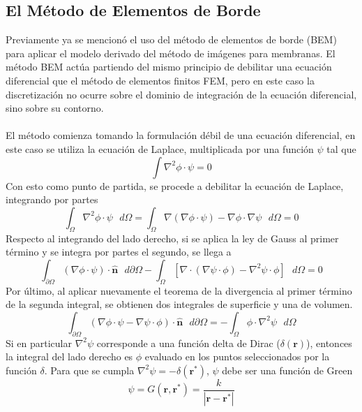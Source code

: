 \documentclass[12pt, notitlepage]{article}
\numberwithin{equation}{section}
\begin{document}
\subsection{El Método de Elementos de Borde}
Previamente ya se mencionó el uso del método de elementos de borde (BEM) para aplicar el modelo derivado del método de imágenes para membranas. El método BEM actúa partiendo del mismo principio de debilitar una ecuación diferencial que el método de elementos finitos FEM, pero en este caso la discretización no ocurre sobre el dominio de integración de la ecuación diferencial, sino sobre su contorno.\\\\
El método comienza tomando la formulación débil de una ecuación diferencial, en este caso se utiliza la ecuación de Laplace, multiplicada por una función $\psi$ tal que
\begin{equation}
\int\nabla^2 \phi\cdot\psi = 0
\end{equation}
Con esto como punto de partida, se procede a debilitar la ecuación de Laplace, integrando por partes
\begin{equation}
\int_\Omega \nabla^2\phi\cdot\psi\text{ }d\Omega = \int_\Omega \nabla(\nabla \phi\cdot\psi) - \nabla\phi\cdot\nabla\psi\text{ }d\Omega = 0
\end{equation}
Respecto al integrando del lado derecho, si se aplica la ley de Gauss al primer término y se integra por partes el segundo, se llega a
\begin{equation}
\int_{\partial\Omega} (\nabla\phi\cdot\psi)\cdot\hat{\mathbf{n}}\text{ }d\partial\Omega - \int_\Omega [\nabla\cdot(\nabla\psi\cdot\phi) - \nabla^2\psi\cdot\phi]\text{ }d\Omega = 0
\end{equation}
Por último, al aplicar nuevamente el teorema de la divergencia al primer término de la segunda integral, se obtienen dos integrales de superficie y una de volumen.
\begin{equation}
\int_{\partial\Omega} (\nabla\phi\cdot\psi - \nabla\psi\cdot\phi) \cdot\hat{\mathbf{n}}\text{ }d\partial\Omega = -\int_\Omega \phi\cdot\nabla^2\psi\text{ }d\Omega
\end{equation}
Si en particular $\nabla^2\psi$ corresponde a una función delta de Dirac ($\delta(\mathbf{r})$), entonces la integral del lado derecho es $\phi$ evaluado en los puntos seleccionados por la función $\delta$. Para que se cumpla $\nabla^2\psi = -\delta(\mathbf{r}^*)$, $\psi$ debe ser una función de Green
\begin{equation}
\psi = G(\mathbf{r},\mathbf{r}^*) = \frac{k}{|\mathbf{r} - \mathbf{r}^*|}
\end{equation}
\end{document}
